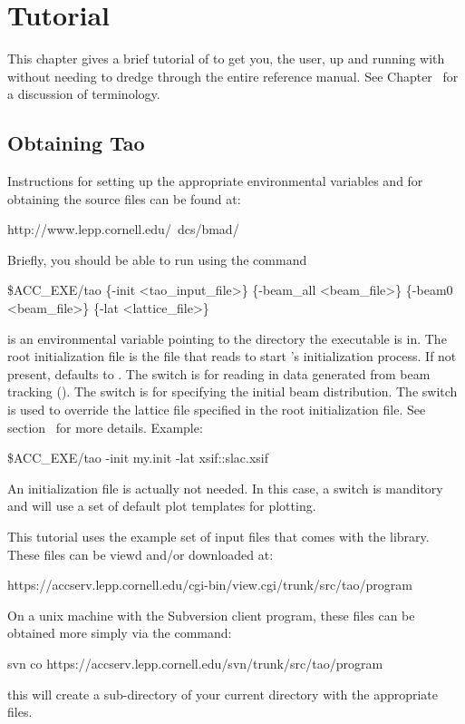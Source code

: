 \chapter{Tutorial}
\label{c:tutorial}

This chapter gives a brief tutorial of \tao to get you, the user, up
and running with \tao without needing to dredge through the entire
reference manual. See Chapter~ for a discussion of
\tao terminology.

\section{Obtaining Tao}
\label{s:obtaining}

Instructions for setting up the appropriate environmental variables
and for obtaining the source files can be found at:
\begin{example}
  http://www.lepp.cornell.edu/~dcs/bmad/
\end{example}

Briefly, you should be able to run \tao using the command
\begin{example}
  \$ACC_EXE/tao \{-init <tao_input_file>\} \{-beam_all <beam_file>\} 
           \{-beam0 <beam_file>\} \{-lat <lattice_file>\}
\end{example}
 is an environmental variable pointing to the directory
the \tao executable is in.  The root initialization file
 is the file that \tao reads to start \tao's
initialization process. If not present,  defaults
to . The  switch is for reading in data
generated from beam tracking (). The 
switch is for specifying the initial beam distribution.  The
 switch is used to override the lattice file specified in
the root initialization file. See section~ for
more details. Example:
\begin{example}
  \$ACC_EXE/tao -init my.init -lat xsif::slac.xsif
\end{example}
An initialization file is actually not needed. In this case, a
 switch is manditory and \tao will use a set of default plot
templates for plotting.

This tutorial uses the example set of input files that comes with the \tao library.
These files can be viewd and/or downloaded at:
\begin{example}
  https://accserv.lepp.cornell.edu/cgi-bin/view.cgi/trunk/src/tao/program
\end{example}
On a unix machine with the Subversion  client program, 
these files can be obtained more simply via the command:
\begin{example}
  svn co https://accserv.lepp.cornell.edu/svn/trunk/src/tao/program
\end{example}
this will create a sub-directory  of your current directory with 
the appropriate files.

